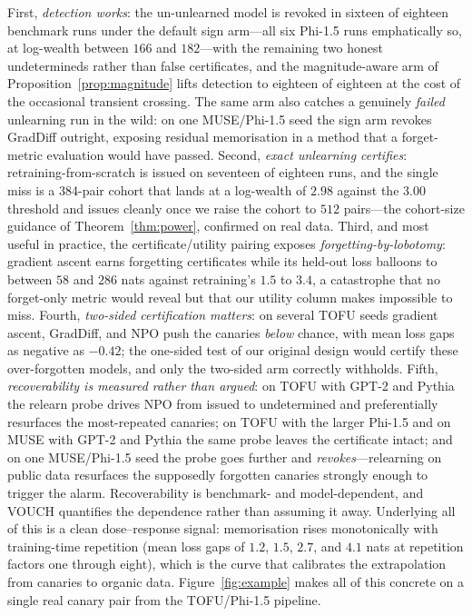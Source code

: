First, \emph{detection works}: the un-unlearned model is revoked in sixteen of
eighteen benchmark runs under the default sign arm---all six Phi-1.5 runs
emphatically so, at log-wealth between $166$ and $182$---with the remaining two honest
undetermineds rather than false certificates, and the magnitude-aware arm of
Proposition~\ref{prop:magnitude} lifts detection to eighteen of eighteen at the cost
of the occasional transient crossing. The same arm also catches a genuinely
\emph{failed} unlearning run in the wild: on one MUSE/Phi-1.5 seed the sign arm
revokes GradDiff outright, exposing residual memorisation in a method that a
forget-metric evaluation would have passed. Second, \emph{exact unlearning
certifies}: retraining-from-scratch is issued on seventeen of eighteen runs, and the
single miss is a 384-pair cohort that lands at a log-wealth of $2.98$ against the
$3.00$ threshold and issues cleanly once we raise the cohort to $512$ pairs---the
cohort-size guidance of Theorem~\ref{thm:power}, confirmed on real data. Third, and
most useful in practice, the certificate/utility pairing exposes
\emph{forgetting-by-lobotomy}: gradient ascent
earns forgetting certificates while its held-out loss balloons to between $58$ and
$286$ nats against retraining's $1.5$ to $3.4$, a catastrophe that no forget-only
metric would reveal but that our utility column makes impossible to miss. Fourth,
\emph{two-sided certification matters}: on several TOFU seeds gradient ascent, GradDiff,
and NPO push the canaries \emph{below} chance, with mean loss gaps as negative as
$-0.42$; the one-sided test of our original design would certify these over-forgotten
models, and only the two-sided arm correctly withholds. Fifth, \emph{recoverability is
measured rather than argued}: on TOFU with GPT-2 and Pythia the relearn probe drives
NPO from issued to undetermined and preferentially resurfaces the most-repeated
canaries; on TOFU with the larger Phi-1.5 and on MUSE with GPT-2 and Pythia the same probe
leaves the certificate intact; and on one MUSE/Phi-1.5 seed the probe goes further
and \emph{revokes}---relearning on public data resurfaces the supposedly forgotten
canaries strongly enough to trigger the alarm. Recoverability is benchmark- and
model-dependent, and VOUCH quantifies the dependence rather than assuming it away. Underlying all of this is a clean dose--response
signal: memorisation rises monotonically with training-time repetition (mean loss gaps
of $1.2$, $1.5$, $2.7$, and $4.1$ nats at repetition factors one through eight),
which is the curve that calibrates the extrapolation from canaries to organic data.
Figure~\ref{fig:example} makes all of this concrete on a single real canary pair
from the TOFU/Phi-1.5 pipeline.

